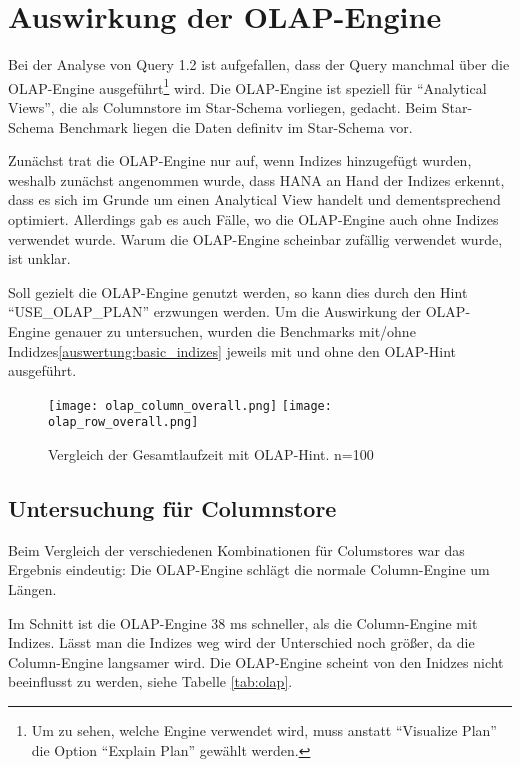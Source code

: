 \section{Auswirkung der OLAP-Engine}\label{auswertung:olap}
Bei der Analyse von Query 1.2 ist aufgefallen, dass der Query manchmal über die OLAP-Engine 
ausgeführt\footnote{Um zu sehen, welche Engine verwendet wird, muss anstatt \enquote{Visualize Plan} die Option \enquote{Explain Plan} gewählt werden.} wird. 
Die OLAP-Engine ist speziell für \enquote{Analytical Views}, die als Columnstore im Star-Schema vorliegen, gedacht. Beim Star-Schema Benchmark liegen die Daten definitv im Star-Schema vor.


Zunächst trat die OLAP-Engine nur auf, wenn Indizes hinzugefügt wurden, weshalb zunächst angenommen wurde, dass
 HANA an Hand der Indizes erkennt, dass es sich im Grunde um einen Analytical View handelt und dementsprechend optimiert.
Allerdings gab es auch Fälle, wo die OLAP-Engine auch ohne Indizes verwendet wurde. Warum die OLAP-Engine scheinbar zufällig verwendet wurde, ist unklar.

Soll gezielt die OLAP-Engine genutzt werden, so kann dies durch den Hint \enquote{USE\_OLAP\_PLAN} erzwungen werden. 
Um die Auswirkung der OLAP-Engine genauer zu untersuchen, wurden die Benchmarks mit/ohne Indidzes\autoref{auswertung:basic_indizes} jeweils mit und ohne den OLAP-Hint ausgeführt.


\begin{figure}[H]
    \centering
    \texttt{[image: olap\_column\_overall.png]}
    \texttt{[image: olap\_row\_overall.png]}
    \caption{Vergleich der Gesamtlaufzeit mit OLAP-Hint. n=100}
	\label{fig:olap_overall}
\end{figure}

\subsection{Untersuchung für Columnstore}
Beim Vergleich der verschiedenen Kombinationen für Columstores war das Ergebnis eindeutig: Die OLAP-Engine schlägt die normale Column-Engine um Längen.

Im Schnitt ist die OLAP-Engine 38 ms schneller, als die Column-Engine mit Indizes. Lässt man die Indizes weg wird der Unterschied noch größer, da die Column-Engine langsamer wird.
 Die OLAP-Engine scheint von den Inidzes nicht beeinflusst zu werden, siehe Tabelle \autoref{tab:olap}.

